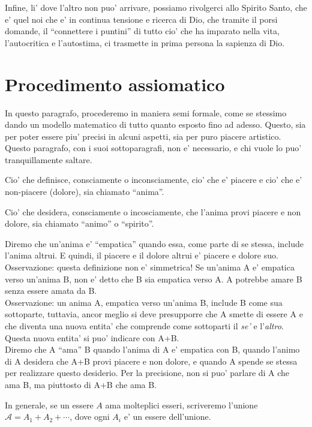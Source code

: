 Infine, li' dove l'altro non puo' arrivare, possiamo rivolgerci allo Spirito Santo, che e' quel noi che e' in continua tensione e ricerca di Dio, che tramite il porsi domande, il ``connettere i puntini'' di tutto cio' che ha imparato nella vita, l'autocritica e l'autostima, ci trasmette in prima persona la sapienza di Dio.



\section{Procedimento assiomatico}
\label{procAx}

In questo paragrafo, procederemo in maniera semi formale, come se stessimo dando un modello matematico di tutto quanto esposto fino ad adesso. Questo, sia per poter essere piu' precisi in alcuni aspetti, sia per puro piacere artistico. Questo paragrafo, con i suoi sottoparagrafi, non e' necessario, e chi vuole lo puo' tranquillamente saltare.

Cio' che definisce, consciamente o inconsciamente, cio' che e' piacere e cio' che e' non-piacere (dolore), sia chiamato ``anima''.

Cio' che desidera, consciamente o incosciamente, che l'anima provi piacere e non dolore, sia chiamato ``animo'' o ``spirito''.

Diremo che un'anima e' ``empatica'' quando essa, come parte di se stessa, include l'anima altrui. E quindi, il piacere e il dolore altrui e' piacere e dolore suo. \\
Osservazione: questa definizione non e' simmetrica! Se un'anima A e' empatica verso un'anima B, non e' detto che B sia empatica verso A. A potrebbe amare B senza essere amata da B. \\
Osservazione: un anima A, empatica verso un'anima B, include B come sua sottoparte, tuttavia, ancor meglio si deve presupporre che A smette di essere A e che diventa una nuova entita' che comprende come sottoparti il \emph{se'} e l'\emph{altro}. Questa nuova entita' si puo' indicare con A+B. \\

Diremo che A ``ama'' B quando l'anima di A e' empatica con B, quando l'animo di A desidera che A+B provi piacere e non dolore, e quando A spende se stessa per realizzare questo desiderio. Per la precisione, non si puo' parlare di A che ama B, ma piuttosto di A+B che ama B. 

In generale, se un essere $A$ ama molteplici esseri, scriveremo l'unione $\mathcal{A}=A_1+A_2+\cdots$, dove ogni $A_i$ e' un essere dell'unione.

